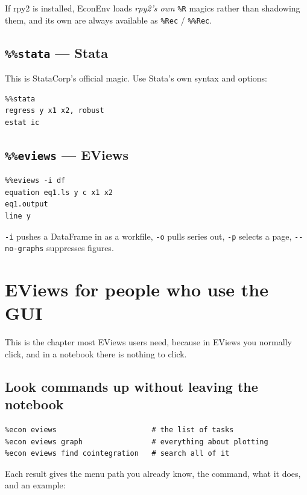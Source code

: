 \documentclass[11pt,a4paper]{report}
\begin{document}
If rpy2 is installed, EconEnv loads \emph{rpy2's own} \texttt{\%R} magics rather
than shadowing them, and its own are always available as \texttt{\%Rec} /
\texttt{\%\%Rec}.

\section{\texttt{\%\%stata} --- Stata}

This is StataCorp's official magic. Use Stata's own syntax and options:

\begin{lstlisting}
%%stata
regress y x1 x2, robust
estat ic
\end{lstlisting}

\section{\texttt{\%\%eviews} --- EViews}

\begin{lstlisting}
%%eviews -i df
equation eq1.ls y c x1 x2
eq1.output
line y
\end{lstlisting}

\texttt{-i} pushes a DataFrame in as a workfile, \texttt{-o} pulls series out,
\texttt{-p} selects a page, \texttt{-{}-no-graphs} suppresses figures.

\chapter{EViews for people who use the GUI}

This is the chapter most EViews users need, because in EViews you normally
click, and in a notebook there is nothing to click.

\section{Look commands up without leaving the notebook}

\begin{lstlisting}
%econ eviews                      # the list of tasks
%econ eviews graph                # everything about plotting
%econ eviews find cointegration   # search all of it
\end{lstlisting}

Each result gives the menu path you already know, the command, what it does, and
an example:
\end{document}

